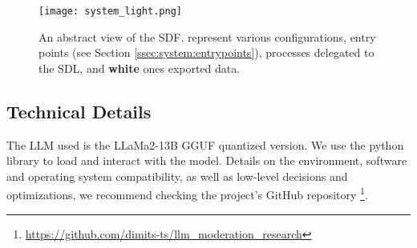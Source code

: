 \begin{figure}
	\centering
	\texttt{[image: system\_light.png]}
	\caption{An abstract view of the \ac{SDF}.  represent various configurations,  entry points (see Section \ref{ssec:system:entrypoints}),  processes delegated to the \ac{SDL}, and \textbf{white} ones exported data.}
	\label{fig::system}
\end{figure}



\subsection{Technical Details}
\label{ssec:system:details}

The LLM used is the LLaMa2-13B GGUF quantized version. We use the  python library to load and interact with the model. Details on the environment, software and operating system compatibility, as well as low-level decisions and optimizations, we recommend checking the project's GitHub repository \footnote{\url{https://github.com/dimits-ts/llm_moderation_research}}.

